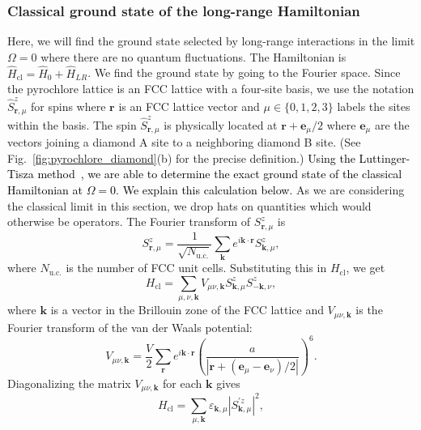 \documentclass[twocolumn,superscriptaddress,amsmath,amssymb,aps,prx,nofootinbib]{revtex4-2}
\newcommand{\newtext}[1]{\textcolor{black}{#1}}
\begin{document}
\subsubsection{Classical ground state of the long-range Hamiltonian}\label{sec:classical}

Here, we will find the ground state selected by long-range interactions in the limit $\Omega = 0$ where there are no quantum fluctuations. The Hamiltonian is $\hat{H}_{\text{cl}} = \hat{H}_0 +  \hat{H}_{LR}$. We find the ground state by going to the Fourier space. Since the pyrochlore lattice is an FCC lattice with a four-site basis, we use the notation $\hat{S}^z_{\mathbf{r},\mu}$ for spins where $\mathbf{r}$ is an FCC lattice vector and $\mu \in \{ 0, 1,2,3 \}$ labels the sites within the basis. The spin $\hat{S}^z_{\mathbf{r},\mu}$ is physically located at $\mathbf{r} + \mathbf{e}_\mu/2$ where $\mathbf{e}_\mu$ are the vectors joining a diamond A site to a neighboring diamond B site. (See Fig.~\ref{fig:pyrochlore_diamond}(b) for the precise definition.)
\newtext{Using the Luttinger-Tisza method~\cite{luttinger1946theory, lyons1960method,litvin1974luttinger}, we are able to determine the exact ground state of the classical Hamiltonian at $\Omega=0$. We explain this calculation below.}
As we are considering the classical limit in this section, we drop hats on quantities which would otherwise be operators. The Fourier transform of $S_{\mathbf{r},\mu}^z$ is
\begin{equation}
  S^z_{\mathbf{r},\mu} = \frac{1}{\sqrt{N_{\text{u.c.}}}} \sum_{\mathbf{k}} e^{i \mathbf{k} \cdot \mathbf{r}}S^z_{\mathbf{k},\mu},
\end{equation}
where $N_{\text{u.c.}}$ is the number of FCC unit cells. Substituting this in $H_{\text{cl}}$, we get 
\begin{equation}
  H_{\text{cl} } = \sum_{\mu,\nu,\mathbf{k}} V_{\mu\nu,\mathbf{k}} S^z_{\mathbf{k},\mu} S^z_{-\mathbf{k},\nu},
\end{equation}
where $\mathbf{k}$ is a vector in the Brillouin zone of the FCC lattice and $V_{\mu\nu,\mathbf{k}}$ is the Fourier transform of the van der Waals potential:
\begin{equation} \label{eq:vlr_ft}
V_{\mu\nu,\mathbf{k}} = \frac{V}{2 } \sum_{\mathbf{r}} e^{i \mathbf{k}\cdot \mathbf{r}} \left( \frac{a}{|\mathbf{r} + (\mathbf{e}_\mu - \mathbf{e}_\nu)/2 |} \right)^6.
\end{equation}
Diagonalizing the matrix $V_{\mu\nu,\mathbf{k}}$ for each $\mathbf{k}$ gives
\begin{equation} \label{eq:H_Omega_0_fourier}
  H_\text{cl} = \sum_{\mu, \mathbf{k}} \varepsilon_{\mathbf{k},\mu} |S^{'z}_{\mathbf{k},\mu}|^2,
\end{equation}
\end{document}
